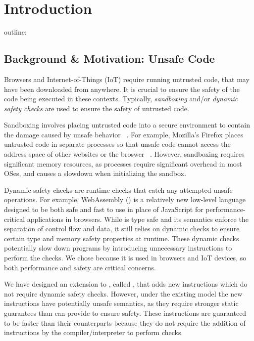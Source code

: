 \chapter{Introduction}
\label{chp:intro}


outline:
\section{Background \& Motivation: Unsafe Code}
Browsers and Internet-of-Things (IoT) require running untrusted code, that may have been downloaded from anywhere.
It is crucial to ensure the safety of the code being executed in these contexts.
Typically, \emph{sandboxing} and/or \emph{dynamic safety checks} are used to ensure the safety of untrusted code.

Sandboxing involves placing untrusted code into a secure environment to contain the damage caused by unsafe behavior ~\cite{sandboxes}.
For example, Mozilla's Firefox places untrusted code in separate processes so that unsafe code cannot access the address space of other websites or the broswer ~\cite{foxbox}.
However, sandboxing requires significant memory resources, as processes require significant overhead in most OSes, and causes a slowdown when initializing the sandbox.

Dynamic safety checks are runtime checks that catch any attempted unsafe operations.
For example, WebAssembly (\wasm) is a relatively new low-level language designed to be both safe and fast to use in place of JavaScript for performance-critical applications in browsers.
While \wasm is type safe and its semantics enforce the separation of control flow and data, it still relies on dynamic checks to ensure certain type and memory safety properties at runtime.
These dynamic checks potentially slow down programs by introducing unnecessary instructions to perform the checks.
We chose \wasm because it is used in browsers and IoT devices, so both performance and safety are critical concerns.

We have designed an extension to \wasm, called \name, that adds new instructions which do not require dynamic safety checks.
However, under the existing \wasm model the new \name instructions have potentially unsafe semantics, as they require stronger static guarantees than \wasm can provide to ensure safety.
These instructions are guaranteed to be faster than their \wasm counterparts because they do not require the addition of instructions by the compiler/interpreter to perform checks.

